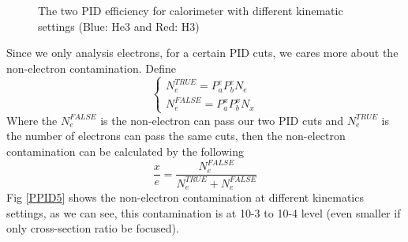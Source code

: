 \begin{figure}[htpb] 

\caption{The two PID efficiency for calorimeter with different kinematic settings  (Blue: He3 and Red: H3)  } \label{PPID4}
\end{figure}



 Since we only analysis electrons, for a certain PID cuts, we cares more about the non-electron contamination. Define 
\begin{equation}  
\left\{   \begin{array}{lr} 
             N_{e}^{TRUE}= P_{a}^{e} P_{b}^{e} N_{e}\\
             N_{e}^{FALSE}= P_{a}^{x} P_{b}^{x} N_{x}
             \end{array}  
\right.  
\end{equation}  
Where the $N_{e}^{FALSE}$ is the non-electron can pass our two PID cuts and $N_{e}^{TRUE}$ is the number of electrons can pass the same cuts, then the non-electron contamination can be calculated by the following 
\begin{equation}\label{eq:eff1}
\dfrac{x}{e}=\dfrac{N_{e}^{FALSE}}{N_{e}^{TRUE}+N_{e}^{FALSE}}
\end{equation}
Fig \ref{PPID5} shows the non-electron contamination at different kinematics settings, as we can see, this contamination is at 10-3 to 10-4 level (even smaller if only cross-section ratio be focused).                                                               
 
